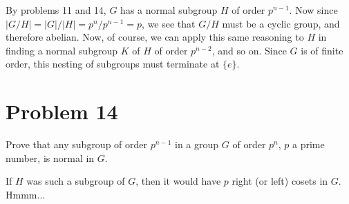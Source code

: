 \documentclass[12pt]{article}
\begin{document}
By problems 11 and 14, $G$ has a normal subgroup $H$ of order $p^{n-1}$.  Now since $|G/H|=|G|/|H|=p^n/p^{n-1}=p$,
we see that $G/H$ must be a cyclic group, and therefore abelian.
Now, of course, we can apply this same reasoning to $H$ in finding a normal subgroup $K$ of $H$ of order $p^{n-2}$,
and so on.  Since $G$ is of finite order, this nesting of subgroups must terminate at $\{e\}$.

\section*{Problem 14}

Prove that any subgroup of order $p^{n-1}$ in a group $G$ of order $p^n$, $p$ a prime number, is normal in $G$.

If $H$ was such a subgroup of $G$, then it would have $p$ right (or left) cosets in $G$.  Hmmm...
\end{document}
